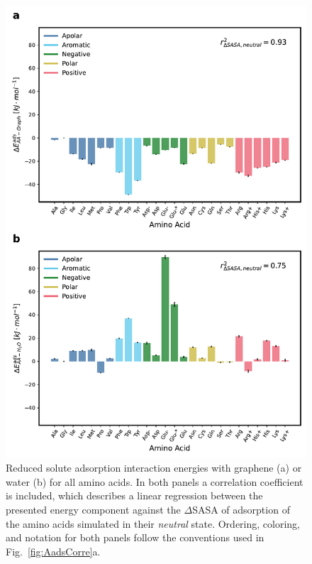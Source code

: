 \documentclass[journal=jcisd8,manuscript=article,layout=twocolumn]{achemso}
\begin{document}
\begin{figure}[htbp]
\centerline{\includegraphics[width=\columnwidth]{figures/Fig5.pdf}}
\caption[]{\label{fig:EneAACorr} Reduced solute adsorption interaction energies with graphene (a) or water (b) for all amino acids. In both panels a correlation coefficient is included, which describes a linear regression between the presented energy component against the $\Delta$SASA of adsorption of the amino acids simulated in their \textit{neutral} state. Ordering, coloring, and notation for both panels follow the conventions used in Fig.~\ref{fig:AadsCorre}a.}
\end{figure}
\end{document}
